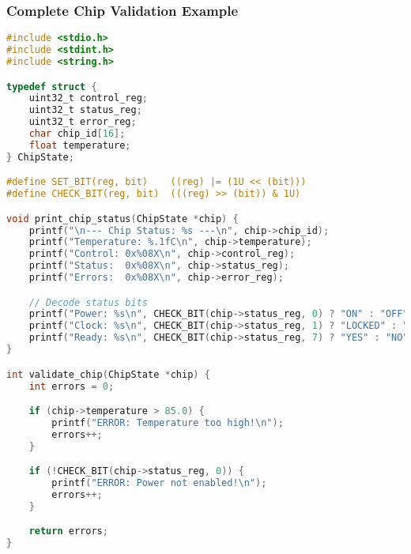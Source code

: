 \documentclass{beamer}
\begin{document}
\begin{frame}[fragile]
\frametitle{Complete Chip Validation Example}
\begin{lstlisting}[language=C, basicstyle=\tiny]
#include <stdio.h>
#include <stdint.h>
#include <string.h>

typedef struct {
    uint32_t control_reg;
    uint32_t status_reg;
    uint32_t error_reg;
    char chip_id[16];
    float temperature;
} ChipState;

#define SET_BIT(reg, bit)    ((reg) |= (1U << (bit)))
#define CHECK_BIT(reg, bit)  (((reg) >> (bit)) & 1U)

void print_chip_status(ChipState *chip) {
    printf("\n--- Chip Status: %s ---\n", chip->chip_id);
    printf("Temperature: %.1fC\n", chip->temperature);
    printf("Control: 0x%08X\n", chip->control_reg);
    printf("Status:  0x%08X\n", chip->status_reg);
    printf("Errors:  0x%08X\n", chip->error_reg);

    // Decode status bits
    printf("Power: %s\n", CHECK_BIT(chip->status_reg, 0) ? "ON" : "OFF");
    printf("Clock: %s\n", CHECK_BIT(chip->status_reg, 1) ? "LOCKED" : "FREE");
    printf("Ready: %s\n", CHECK_BIT(chip->status_reg, 7) ? "YES" : "NO");
}

int validate_chip(ChipState *chip) {
    int errors = 0;

    if (chip->temperature > 85.0) {
        printf("ERROR: Temperature too high!\n");
        errors++;
    }

    if (!CHECK_BIT(chip->status_reg, 0)) {
        printf("ERROR: Power not enabled!\n");
        errors++;
    }

    return errors;
}
\end{lstlisting}
\end{frame}
\end{document}
